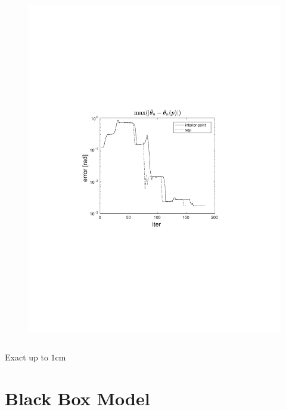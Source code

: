 \documentclass{beamer}
\begin{document}
\begin{frame}
\begin{columns}[t]
\begin{figure}
                \includegraphics[trim=4cm 9cm 4cm 8.5cm, clip=true, width=\linewidth]{img/convPlotT_1}
            \end{figure}
    \end{columns}

    \begin{center}
        Exact up to $1\text{cm}$
    \end{center}
\end{frame}



\section{Black Box Model}
\end{document}
